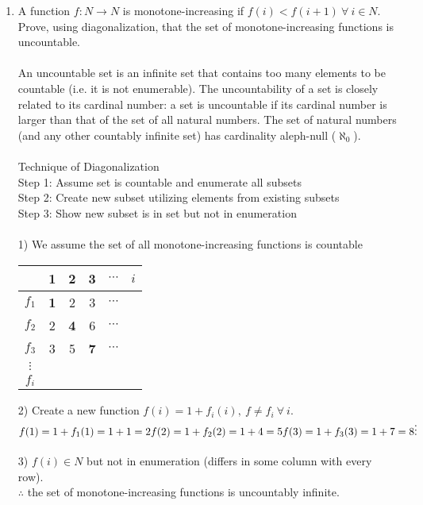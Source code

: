 \documentclass[10pt,a4paper,final]{article}
\begin{document}
\begin{enumerate}
\item %
A function $f : N \rightarrow N$ is monotone-increasing if $f(i) < f(i+1) \: \forall \: i \in N$.\\
Prove, using diagonalization, that the set of monotone-increasing functions is
uncountable.\\
\\
An uncountable set is an infinite set that contains too many elements to be countable
(i.e. it is not enumerable).
The uncountability of a set is closely related to its cardinal number:
a set is uncountable if its cardinal number is larger than that of the set of all natural numbers.
The set of natural numbers (and any other countably infinite set) has cardinality aleph-null
($\aleph_0$).\\
\\
Technique of Diagonalization\\
Step 1: Assume set is countable and enumerate all subsets\\
Step 2: Create new subset utilizing elements from existing subsets\\
Step 3: Show new subset is in set but not in enumeration\\
\\
1) We assume the set of all monotone-increasing functions is countable
\begin{tabular}{c|c c c c c}
& 1 & 2 & 3 & $\cdots$ & $i$ \\
\hline
$f_1$ & \textbf{1} & 2 & 3 & $\cdots$\\
$f_2$ & 2 & \textbf{4} & 6 & $\cdots$\\
$f_3$ & 3 & 5 & \textbf{7} & $\cdots$\\
$\vdots$\\
$f_i$\\
\end{tabular}
2) Create a new function $f(i) = 1 + f_i(i),\: f \neq f_i \: \forall \: i$.\\
$f(1) = 1 + f_1(1) = 1 + 1 = 2\\
f(2) = 1 + f_2(2) = 1 + 4 = 5\\
f(3) = 1 + f_3(3) = 1 + 7 = 8\\
\vdots$\\
\\
3) $f(i) \in N$ but not in enumeration (differs in some column with every row).\\
$\therefore$ the set of monotone-increasing functions is uncountably infinite.


\end{enumerate}
\end{document}
